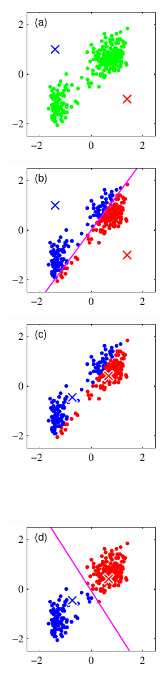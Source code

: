 \begin{figure}[htbp]
  \begin{minipage}{0.33\hsize}
    \begin{center}
      \includegraphics[width=40mm]{img/kmeans/Figure91a.pdf}
    \end{center}
  \end{minipage}
  \begin{minipage}{0.33\hsize}
    \begin{center}
      \includegraphics[width=40mm]{img/kmeans/Figure91b.pdf}
    \end{center}
  \end{minipage}
  \begin{minipage}{0.33\hsize}
    \begin{center}
      \includegraphics[width=40mm]{img/kmeans/Figure91c.pdf}
    \end{center}
  \end{minipage}\\
  \begin{minipage}{0.33\hsize}
    \begin{center}
      \includegraphics[width=40mm]{img/kmeans/Figure91d.pdf}

\end{center}
\end{minipage}
\end{figure}
